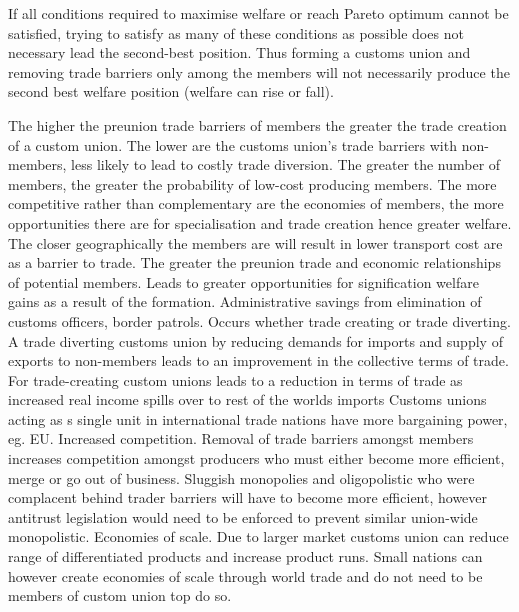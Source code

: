 \documentclass[12pt]{examnotes}
\begin{document}
\ra If all conditions required to maximise welfare or reach Pareto optimum cannot be satisfied, trying to satisfy as many of these conditions as possible does not necessary lead the second-best position.
\ra Thus forming a customs union and removing trade barriers only among the members will not necessarily produce the second best welfare position (welfare can rise or fall).

 The higher the preunion trade barriers of members the greater the trade creation of a custom union.
 The lower are the customs union's trade barriers with non-members, less likely to lead to costly trade diversion. 
 The greater the number of members, the greater the probability of low-cost producing members.
 The more competitive rather than complementary are the economies of members, the more  opportunities there are for specialisation and trade creation hence greater welfare. 
 The closer geographically the members  are will result in lower transport cost are as a barrier to trade.
 The greater the preunion trade and economic relationships of potential members. Leads to greater opportunities for signification welfare gains as a result of the formation.
\vspace{-3pt}
\ra Administrative savings from elimination of customs officers, border patrols. Occurs whether trade creating or trade diverting.
\ra A trade diverting customs union by reducing demands for imports and supply of exports to non-members leads to an improvement in the collective terms of trade.
\ra For trade-creating custom unions leads to a reduction in terms of trade as increased real income spills over to rest of the worlds imports
\ra Customs unions acting as s single unit in international trade nations have more bargaining power, eg. EU.
\vspace{-3pt}
\ra Increased competition. Removal of trade barriers amongst members increases competition amongst producers who must either become more efficient, merge or go out of business. Sluggish monopolies and oligopolistic who were complacent behind trader barriers will have to become more efficient, however antitrust legislation would need to be enforced to prevent similar union-wide monopolistic.
\ra Economies of scale. Due to larger market customs union can reduce range of differentiated products and increase product runs. Small nations can however create economies of scale through world trade and do not need to be members of custom union top do so.
\end{document}
